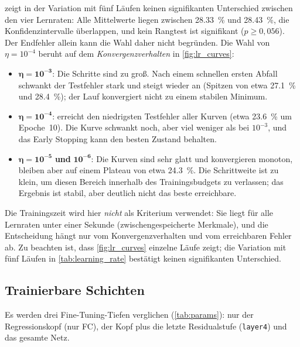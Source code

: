 \documentclass[
  11pt,
  a4paper,
  oneside,
  DIV=12,
  BCOR=8mm,
  parskip=half,
  headings=normal,
  bibliography=totoc,
  listof=totoc
]{scrreprt}
\newcommand{\code}[1]{\texttt{#1}}
\begin{document}
 zeigt in der Variation mit fünf Läufen keinen
signifikanten Unterschied zwischen den vier Lernraten: Alle Mittelwerte liegen
zwischen \SI{28,33}{\percent} und \SI{28,43}{\percent}, die
Konfidenzintervalle überlappen, und kein Rangtest ist signifikant
($p\ge0,056$). Der Endfehler allein kann die Wahl daher nicht begründen. Die
Wahl von $\eta = 10^{-4}$ beruht auf dem \emph{Konvergenzverhalten} in
\cref{fig:lr_curves}:
\begin{itemize}[nosep]
  \item $\bm{\eta = 10^{-3}}$: Die Schritte sind zu groß. Nach einem schnellen
        ersten Abfall schwankt der Testfehler stark und steigt wieder an
        (Spitzen von etwa \SI{27,1}{\percent} und \SI{28,4}{\percent}); der Lauf
        konvergiert nicht zu einem stabilen Minimum.
  \item $\bm{\eta = 10^{-4}}$: erreicht den niedrigsten Testfehler aller
        Kurven (etwa \SI{23,6}{\percent} um Epoche~10). Die Kurve schwankt
        noch, aber viel weniger als bei $10^{-3}$, und das Early Stopping
        kann den besten Zustand behalten.
  \item $\bm{\eta = 10^{-5}}$ \textbf{und} $\bm{10^{-6}}$: Die Kurven sind sehr
        glatt und konvergieren monoton, bleiben aber auf einem Plateau von
        etwa \SI{24,3}{\percent}. Die Schrittweite ist zu klein, um diesen
        Bereich innerhalb des Trainingsbudgets zu verlassen; das Ergebnis ist
        stabil, aber deutlich nicht das beste erreichbare.
\end{itemize}
Die Trainingszeit wird hier \emph{nicht} als Kriterium verwendet: Sie liegt
für alle Lernraten unter einer Sekunde (zwischengespeicherte Merkmale), und
die Entscheidung hängt nur vom Konvergenzverhalten und vom erreichbaren
Fehler ab. Zu beachten ist, dass \cref{fig:lr_curves} einzelne Läufe zeigt;
die Variation mit fünf Läufen in \cref{tab:learning_rate} bestätigt keinen
signifikanten Unterschied.

\subsection{Trainierbare Schichten}
\label{sec:layers}

Es werden drei Fine-Tuning-Tiefen verglichen (\cref{tab:params}): nur der
Regressionskopf (nur FC), der Kopf plus die letzte Residualstufe
(\code{layer4}) und das gesamte Netz.
\end{document}
